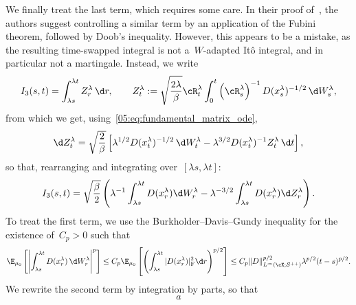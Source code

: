 We finally treat the last term, which requires some care. In their proof of~\cite[Lemma 3.1]{WSW24}, the authors suggest controlling a similar term by an application of the Fubini theorem, followed by Doob's inequality. However, this appears to be a mistake, as the resulting time-swapped integral is not a~$W$-adapted Itô integral, and in particular not a martingale. Instead, we write
\begin{equation}
    I_3(s,t) = \int_{\lambda s}^{\lambda t}Z_r^\lambda\,\d r,\qquad Z_t^\lambda := \sqrt{\frac{2\lambda}{\beta}}\cR_t^\lambda \int_0^t \left(\cR_s^\lambda\right)^{-1}D(x_s^\lambda)^{-1/2}\,\d W^\lambda_s,
\end{equation}
from which we get, using~\eqref{05:eq:fundamental_matrix_ode},
\begin{equation}
    \d Z_t^\lambda = \sqrt{\frac2\beta}\left[\lambda^{1/2}D(x_t^\lambda)^{-1/2}\,\d W_t^\lambda-\lambda^{3/2}D(x_t^\lambda)^{-1}Z_t^\lambda \,\d t\right],
\end{equation}
so that, rearranging and integrating over~$[\lambda s,\lambda t]$:
\begin{equation}
    I_3(s,t) = \sqrt{\frac{\beta}{2}}\left(\lambda^{-1}\int_{\lambda s}^{\lambda t}D(x_r^\lambda)\d W^\lambda_r-\lambda^{-3/2}\int_{\lambda s}^{\lambda t}D(x_r^\lambda)\d Z_r^\lambda\right).
\end{equation}
To treat the first term, we use the Burkholder--Davis--Gundy inequality for the existence of~$C_p>0$ such that
\begin{equation}
    \E_{\mu_0}\left[\left|\int_{\lambda s}^{\lambda t}D(x_r^\lambda)\,\d W_r^\lambda\right|^p\right] \leq C_p \E_{\mu_0}\left[\left(\int_{\lambda s}^{\lambda t}|D(x_r^\lambda)|^2_{\mathrm{F}}\d r\right)^{p/2}\right]\leq C_p\|D\|_{L^\infty(\cX;\mathcal S^{++})}^{p/2}\lambda^{p/2}(t-s)^{p/2}.
\end{equation}
We rewrite the second term by integration by parts, so that
\begin{equation}
    a
\end{equation}
